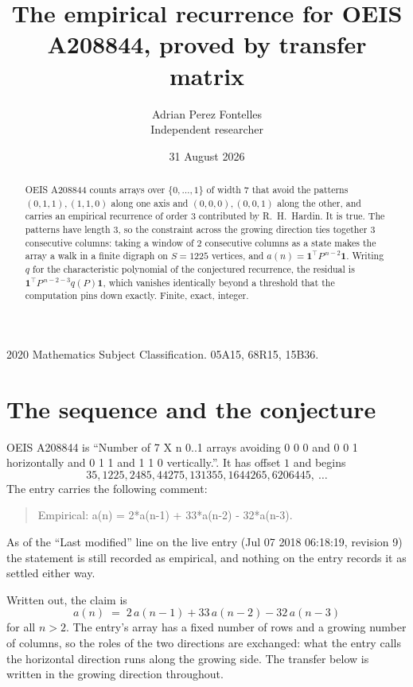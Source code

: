 \documentclass[11pt,a4paper]{article}
\title{The empirical recurrence for OEIS A208844, proved by transfer matrix}
\author{Adrian Perez Fontelles\\ \small Independent researcher}
\date{31 August 2026}
\theoremstyle{plain}
\theoremstyle{definition}
\begin{document}
\maketitle

\begin{abstract}
OEIS A208844 counts arrays over $\{0,\dots,1\}$ of width $7$ that avoid the patterns
$(0,1,1), (1,1,0)$ along one axis and $(0,0,0), (0,0,1)$ along the other, and carries an empirical recurrence of
order $3$ contributed by R.~H.~Hardin. It is true. The patterns have length $3$, so
the constraint across the growing direction ties together $3$ consecutive columns: taking a
window of $2$ consecutive columns as a state makes the array a walk in a finite digraph
on $S=1225$ vertices, and $a(n)=\mathbf{1}^{\!\top}P^{\,n-2}\mathbf{1}$. Writing $q$
for the characteristic polynomial of the conjectured recurrence, the residual is
$\mathbf{1}^{\!\top}P^{\,n-2-3}q(P)\mathbf{1}$, which vanishes identically
beyond a threshold that the computation pins down exactly. Finite, exact, integer.
\end{abstract}

\noindent\small 2020 Mathematics Subject Classification. 05A15, 68R15, 15B36.\normalsize

\section{The sequence and the conjecture}

OEIS A208844 is ``Number of 7 X n 0..1 arrays avoiding 0 0 0 and 0 0 1 horizontally and 0 1 1 and 1 1 0 vertically.''. It has offset
$1$ and begins
\[
35, 1225, 2485, 44275, 131355, 1644265, 6206445,\ \dots
\]
The entry carries the following comment:
\begin{quote}\small
Empirical: a(n) = 2*a(n-1) + 33*a(n-2) - 32*a(n-3).
\end{quote}
As of the ``Last modified'' line on the live entry (Jul 07 2018 06:18:19, revision
9) the statement is still recorded as empirical, and nothing on the entry
records it as settled either way.

Written out, the claim is
\begin{equation}\label{eq:conj}
a(n)\;=\;2\,a(n-1) + 33\,a(n-2) - 32\,a(n-3)
\end{equation}
for all $n>2$. The entry's array has a fixed number of rows and a growing number of
columns, so the roles of the two directions are exchanged: what the entry calls the
horizontal direction runs along the growing side. The transfer below is written in the
growing direction throughout.
\end{document}
